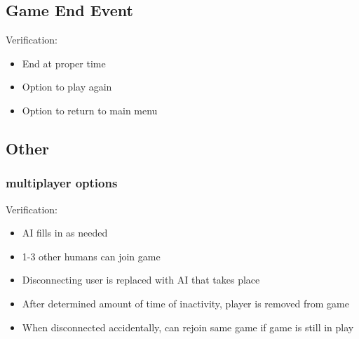 \documentclass[11pt, titlepage]{article}
\begin{document}
		\subsection{Game End Event}
			Verification:
			\begin{itemize}
				\item End at proper time
				\item Option to play again
				\item Option to return to main menu
			\end{itemize}

		\subsection{Other}	
			\subsubsection{multiplayer options}
			Verification:
			\begin{itemize}
				\item AI fills in as needed
				\item 1-3 other humans can join game
				\item Disconnecting user is replaced with AI that takes place
				\item After determined amount of time of inactivity, player is removed from game
				\item When disconnected accidentally, can rejoin same game if game is still in play
			\end{itemize}
			
		
\end{document}

